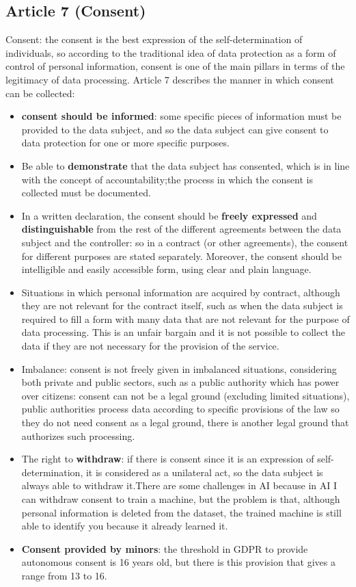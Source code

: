 \subsection{Article 7 (Consent)}
Consent: the consent is the best expression of the self-determination of individuals, so according to the traditional idea of data protection as a form of control of personal information, consent is one of the main pillars in terms of the legitimacy of data processing.
Article 7 describes the manner in which consent can be collected:
\begin{itemize}
    \item \textbf{consent should be informed}: some specific pieces of information must be provided to the data subject, and so the data subject can give consent to data protection for one or more specific purposes.
    \item Be able to \textbf{demonstrate} that the data subject has consented, which is in line with the concept of accountability;the process in which the consent is collected must be documented.
    \item In a written declaration, the consent should be \textbf{freely expressed} and \textbf{distinguishable} from the rest of the different agreements between the data subject and the controller: so in a contract (or other agreements), the consent for different purposes are stated separately. Moreover, the consent should be intelligible and easily accessible form, using clear and plain language.
    \item  Situations in which personal information are acquired by contract, although they are not relevant for the contract itself, such as when the data subject is required to fill a form with many data that are not relevant for the purpose of data processing. This is an unfair bargain and it is not possible to collect the data if they are not necessary for the provision of the service.
    \item Imbalance: consent is not freely given in imbalanced situations, considering both private and public sectors, such as a public authority which has power over citizens: consent can not be a legal ground (excluding limited situations), public authorities process data according to specific provisions of the law so they do not need consent as a legal ground, there is another legal ground that authorizes such processing.
    \item The right to \textbf{withdraw}: if there is consent since it is an expression of self-determination, it is considered as a unilateral act, so the data subject is always able to withdraw it.There are some challenges in AI because in AI I can withdraw consent to train a machine, but the problem is that, although personal information is deleted from the dataset, the trained machine is still able to identify you because it already learned it.
    \item \textbf{Consent provided by minors}: the threshold in GDPR to provide autonomous consent is 16 years old, but there is this provision that gives a range from 13 to 16.
\end{itemize}

